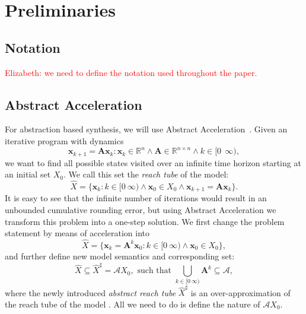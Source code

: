 \documentclass[twocolumn]{autart}    %
\newcommand{\mat}[1]{\boldsymbol{#1}}
\renewcommand{\vec}[1]{\boldsymbol{#1}}
\begin{document}
\section{Preliminaries}
\label{sec:preliminaries}


\subsection{Notation} 
\label{ssec:notation}

\textcolor{red}{Elizabeth: we need to define the notation used throughout the paper.}


\subsection{Abstract Acceleration} 
\label{ssec:aa}

For abstraction based synthesis, we will use Abstract
Acceleration~\cite{JSS14,cattaruzza2015unbounded}.  Given an iterative
program with dynamics
%
\begin{equation}
\vec{x}_{k+1}=\mat{A}\vec{x}_k : \vec{x}_k \in \mathbb{R}^n \wedge \mat{A} \in \mathbb{R}^{n \times n} \wedge k \in [0\ \ \infty),
\end{equation}
%
we want to find all possible states visited over an infinite time horizon
starting at an initial set $X_0$.  We call this set the \emph{reach tube} of
the model:
%
\begin{equation}
\hat{X} = \{ \vec{x}_k : k \in [0\ \infty) \wedge \vec{x}_0 \in X_0 \wedge \vec{x}_{k+1}=\mat{A}\vec{x}_k\}.
\end{equation}
%
It is easy to see that the infinite number of iterations would result in an
unbounded cumulative rounding error, but using Abstract Acceleration we
transform this problem into a one-step solution.  We first change the
problem statement by means of acceleration into
%
\begin{equation}
\hat{X} = \{ \vec{x}_k=\mat{A}^k\vec{x}_0 : k \in [0\ \infty) \wedge \vec{x}_0 \in X_0 \}, 
\end{equation}
%
and further define new model semantics and corresponding set: 
%
\begin{equation}\label{eq:aa_reachtube}
\hat{X} \subseteq \hat{X}^\sharp = \mathcal{A}X_0, \text{ such that } \bigcup_{k \in [0\ \infty)} \mat{A}^k \subseteq \mathcal{A}, 
\end{equation}
%
where the newly introduced \emph{abstract reach tube} $\hat{X}^\sharp$ is an
over-approximation of the reach tube of the model \cite{JSS14}.  All we need
to do is define the nature of $\mathcal{A}X_0$.
\end{document}
